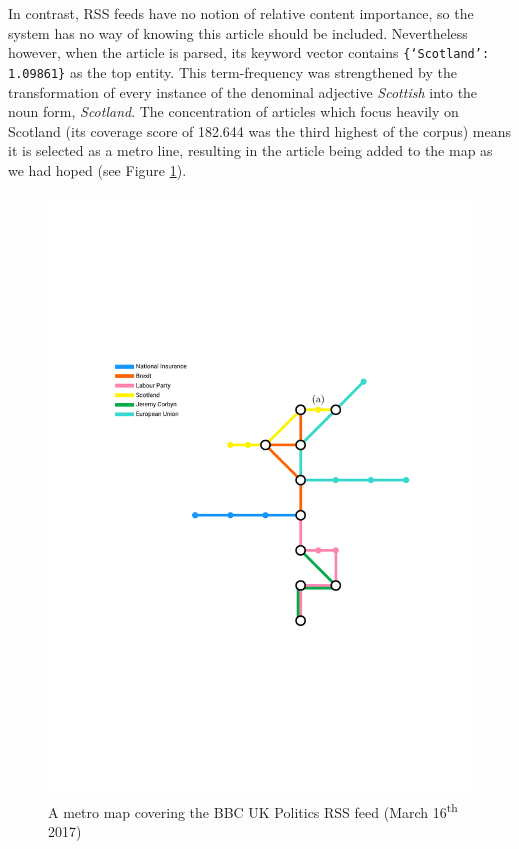 In contrast, RSS feeds have no notion of relative content importance, so the system has no way of knowing this article should be included. Nevertheless however, when the article is parsed, its keyword vector contains \texttt{\{`Scotland': 1.09861\}} as the top entity. This term-frequency was strengthened by the transformation of every instance of the denominal adjective \textit{Scottish} into the noun form, \textit{Scotland}. The concentration of articles which focus heavily on Scotland (its coverage score of 182.644 was the third highest of the corpus) means it is selected as a metro line, resulting in the article being added to the map as we had hoped (see Figure \ref{fig:bbc-pol}).

\begin{figure}[htbp!]
	\centering
	\includegraphics[width=\textwidth]{img/results/bbc-politics.pdf}
	\caption{A metro map covering the BBC UK Politics RSS feed (March 16\textsuperscript{th} 2017)}
	\label{fig:bbc-pol}
\end{figure}

